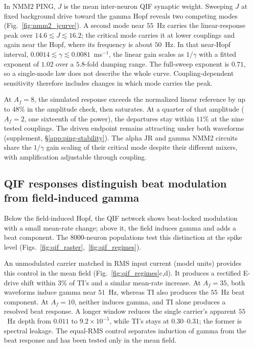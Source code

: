 \documentclass[11pt,a4paper]{article}
\begin{document}
In NMM2 PING, $J$ is the mean inter-neuron QIF synaptic weight.
Sweeping $J$ at fixed background drive toward the gamma Hopf reveals two
competing modes (Fig.~\ref{fig:nmm2_jcurve}). A second mode near $55$~Hz carries
the linear-response peak over $14.6\lesssim J\lesssim16.2$; the critical mode
carries it at lower couplings and again near the Hopf, where its frequency is
about $50$~Hz. In that near-Hopf interval,
$0.0014\lesssim\gamma\lesssim0.0081$~ms$^{-1}$, the linear gain scales as
$1/\gamma$ with a fitted exponent of $1.02$ over a $5.8$-fold damping range.
The full-sweep exponent is $0.71$, so a single-mode law does not describe the
whole curve. Coupling-dependent sensitivity \cite{clusella2023} therefore
includes changes in which mode carries the peak.

At $A_f=8$, the simulated response exceeds the normalized linear reference by
up to $48\%$ in the amplitude check, then saturates. At a quarter of that
amplitude ($A_f=2$, one sixteenth of the power), the departures stay within
$11\%$ at the nine tested couplings. The driven endpoint remains attracting under both waveforms
(supplement, \S\ref{app:ping-stability}).
The alpha JR and gamma NMM2 circuits share the $1/\gamma$ gain scaling of their critical mode despite their different
mixers, with amplification adjustable through coupling.

\subsection{QIF responses distinguish beat modulation from field-induced gamma}\label{sec:qif}
Below the field-induced Hopf, the QIF network shows beat-locked modulation with
a small mean-rate change; above it, the field induces gamma and adds a beat
component. The $8000$-neuron populations test this distinction at the spike level
\cite{montbrio2015,ruffini2025rosetta,clusella2023}
(Figs.~\ref{fig:qif_raster},~\ref{fig:qif_regimes}).

An unmodulated carrier matched in RMS input current (model units)
provides this control in the mean field (Fig.~\ref{fig:qif_regimes}c,d). It produces a rectified E-drive
shift within $3\%$ of TI's and a similar mean-rate increase. At $A_f=35$, both
waveforms induce gamma near $51$~Hz, whereas TI also produces the $55$~Hz beat
component. At $A_f=10$, neither induces gamma, and TI alone produces a resolved beat
response. A longer window reduces the single carrier's apparent $55$~Hz
depth from $0.011$ to $9.2\times10^{-5}$, while TI's stays at $0.30$--$0.31$;
the former is spectral leakage. The equal-RMS control separates induction
of gamma from the beat response and has been tested only in the mean field.
\end{document}
